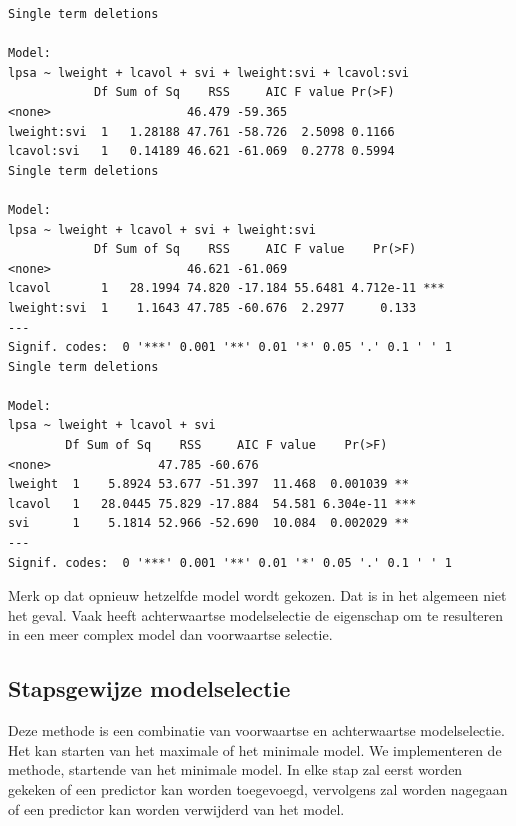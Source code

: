 \documentclass[
  dutch,
  letterpaper,
  12pt]{book}
\newcounter{none} %
\theoremstyle{definition}
\theoremstyle{definition}
\theoremstyle{definition}
\theoremstyle{remark}
\begin{document}
\begin{verbatim}
Single term deletions

Model:
lpsa ~ lweight + lcavol + svi + lweight:svi + lcavol:svi
            Df Sum of Sq    RSS     AIC F value Pr(>F)
<none>                   46.479 -59.365               
lweight:svi  1   1.28188 47.761 -58.726  2.5098 0.1166
lcavol:svi   1   0.14189 46.621 -61.069  0.2778 0.5994
Single term deletions

Model:
lpsa ~ lweight + lcavol + svi + lweight:svi
            Df Sum of Sq    RSS     AIC F value    Pr(>F)    
<none>                   46.621 -61.069                      
lcavol       1   28.1994 74.820 -17.184 55.6481 4.712e-11 ***
lweight:svi  1    1.1643 47.785 -60.676  2.2977     0.133    
---
Signif. codes:  0 '***' 0.001 '**' 0.01 '*' 0.05 '.' 0.1 ' ' 1
Single term deletions

Model:
lpsa ~ lweight + lcavol + svi
        Df Sum of Sq    RSS     AIC F value    Pr(>F)    
<none>               47.785 -60.676                      
lweight  1    5.8924 53.677 -51.397  11.468  0.001039 ** 
lcavol   1   28.0445 75.829 -17.884  54.581 6.304e-11 ***
svi      1    5.1814 52.966 -52.690  10.084  0.002029 ** 
---
Signif. codes:  0 '***' 0.001 '**' 0.01 '*' 0.05 '.' 0.1 ' ' 1
\end{verbatim}

Merk op dat opnieuw hetzelfde model wordt gekozen. Dat is in het
algemeen niet het geval. Vaak heeft achterwaartse modelselectie de
eigenschap om te resulteren in een meer complex model dan voorwaartse
selectie.

\subsection{Stapsgewijze
modelselectie}\label{stapsgewijze-modelselectie}

Deze methode is een combinatie van voorwaartse en achterwaartse
modelselectie. Het kan starten van het maximale of het minimale model.
We implementeren de methode, startende van het minimale model. In elke
stap zal eerst worden gekeken of een predictor kan worden toegevoegd,
vervolgens zal worden nagegaan of een predictor kan worden verwijderd
van het model.
\end{document}
